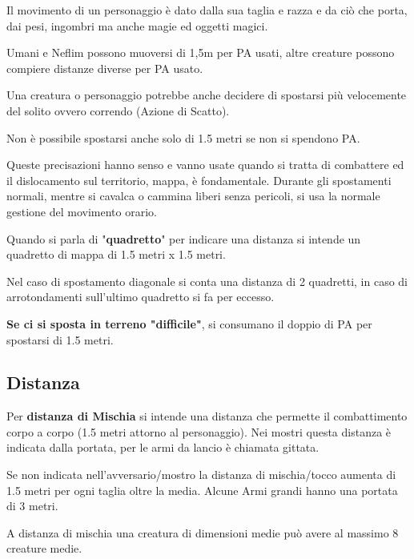 \documentclass[12pt,a4paper,twoside,openany]{book}
\begin{document}
\begin{multicols}{2}

Il movimento di un personaggio è dato dalla sua taglia e razza e da ciò che porta, dai pesi, ingombri ma anche magie ed oggetti magici.

Umani e Neflim possono muoversi di 1,5m per PA usati, altre creature possono compiere distanze diverse per PA usato.

Una creatura o personaggio potrebbe anche decidere di spostarsi più velocemente del solito ovvero correndo (Azione di Scatto).

Non è possibile spostarsi anche solo di 1.5 metri se non si spendono PA.

Queste precisazioni hanno senso e vanno usate quando si tratta di combattere ed il dislocamento sul territorio, mappa, è fondamentale. Durante gli spostamenti normali, mentre si cavalca o cammina liberi senza pericoli, si usa la normale gestione del movimento orario.

Quando si parla di "\textbf{quadretto}" per indicare una distanza si intende un quadretto di mappa di 1.5 metri x 1.5 metri.

Nel caso di spostamento diagonale si conta una distanza di 2 quadretti, in caso di arrotondamenti sull'ultimo quadretto si fa per eccesso.

\textbf{Se ci si sposta in terreno "difficile"}, si consumano il doppio di PA per spostarsi di 1.5 metri.

\subsection{Distanza}\label{distanza}

Per \textbf{distanza di Mischia}  si intende una distanza che permette il combattimento corpo a corpo (1.5 metri attorno al personaggio). Nei mostri questa distanza è indicata dalla portata, per le armi da lancio è chiamata gittata.

Se non indicata nell'avversario/mostro la distanza di mischia/tocco aumenta di 1.5 metri per ogni taglia oltre la media.
Alcune Armi grandi hanno una portata di 3 metri.

A distanza di mischia una creatura di dimensioni medie può avere al massimo 8 creature medie.

\end{multicols}
\end{document}
